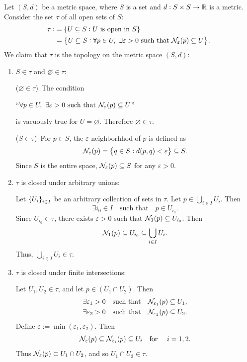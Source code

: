 \documentclass[11pt,openany]{article}
\begin{document}
\newpage
\begin{exercise*}
	Let $(S,d)$ be a metric space, where $S$ is a set and $d:S\times S\to\mathbb{R}$ is a metric. Consider the set $\tau$ of all open sets of $S$: \begin{align*}
	\tau:&=\set{U\subseteq S:U\ \text{is open in}\ S} \\
	&=\set{U\subseteq S:\forall p\in U,\ \exists\varepsilon>0\ \text{such that}\ \nbhd_\varepsilon(p)\subseteq U}.
	\end{align*} We claim that $\tau$ is the topology on the metric space $(S,d)$: \begin{enumerate}[(\text{O}1)]
	\item $S\in\tau$ and $\varnothing\in\tau$:
	
	($\varnothing\in\tau$)\ The condition \begin{center}
		``$\forall p\in U,\ \exists\varepsilon>0\ \text{such that}\ \nbhd_\varepsilon(p)\subseteq U$''
	\end{center} is vacuously true for $U=\varnothing$. Therefore $\varnothing\in\tau$.
	
	($S\in\tau$)\ For $p\in S$, the $\varepsilon$-neighborhhod of $p$ is defined as\[
	\mathcal{N}_\varepsilon(p)=\set{q\in S: d(p,q)<\varepsilon}\subseteq S.
	\] Since $S$ is the entire space, $\mathcal{N}_\varepsilon(p)\subseteq S$ for any 
	$\varepsilon>0$.
	\item $\tau$ is closed under arbitrary unions:
	
	Let $\set{U_i}_{i\in I}$ be an arbitrary collection of sets in $\tau$. Let $p\in\bigcup_{i\in I}U_i$. Then \[
	\exists i_0\in I\quad\text{such that}\quad p\in U_{i_0}.
	\] Since $U_{i_0}\in\tau$, there exists $\varepsilon>0$ such that $\mathcal{N}_1(p)\subseteq U_{i_0}$. Then \[
	\mathcal{N}_1(p)\subseteq U_{i_0}\subseteq\bigcup_{i\in I}U_i.
	\] Thus, $\bigcup_{i\in I}U_i\in\tau$.
	\item $\tau$ is closed under finite intersections:
	
	Let $U_1,U_2\in\tau$, and let $p\in (U_1\cap U_2)$. Then \begin{align*}
		\exists\varepsilon_1>0\quad\text{such that}\quad \mathcal{N}_{\varepsilon_1}(p)\subseteq U_1,\\
		\exists\varepsilon_2>0\quad\text{such that}\quad \mathcal{N}_{\varepsilon_2}(p)\subseteq U_2.
	\end{align*} Define $\varepsilon:=\min(\varepsilon_1,\varepsilon_2)$. Then \[
		\mathcal{N}_\varepsilon(p)\subseteq\mathcal{N}_{\varepsilon_i}(p)\subseteq U_i\quad\text{for }\quad i=1,2.
	\] Thus $\mathcal{N}_{\varepsilon}(p)\subset U_1\cap U_2$, and so $U_1\cap U_2\in\tau$.
\end{enumerate}
\end{exercise*}
\end{document}
